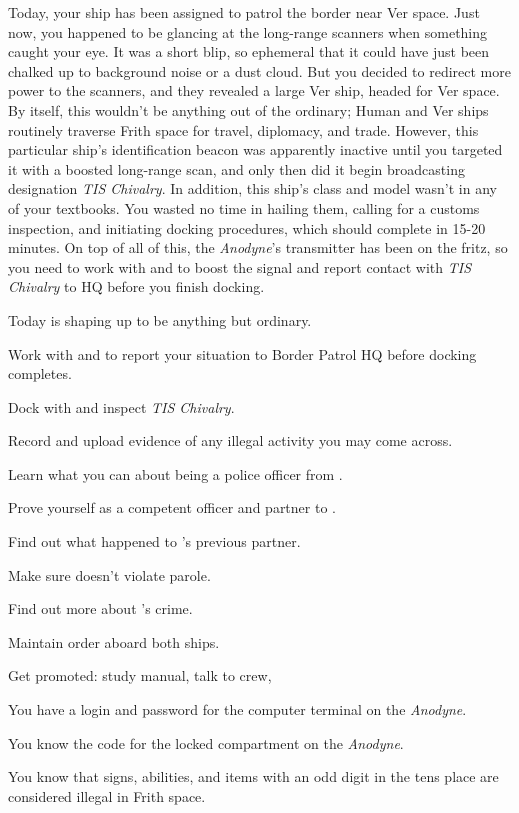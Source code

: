 \documentclass[char]{guildcamp4}
\begin{document}
Today, your ship has been assigned to patrol the border near Ver space. Just now, you happened to be glancing at the long-range scanners when something caught your eye. It was a short blip, so ephemeral that it could have just been chalked up to background noise or a dust cloud. But you decided to redirect more power to the scanners, and they revealed a large Ver ship, headed for Ver space. By itself, this wouldn't be anything out of the ordinary; Human and Ver ships routinely traverse Frith space for travel, diplomacy, and trade. However, this particular ship's identification beacon was apparently inactive until you targeted it with a boosted long-range scan, and only then did it begin broadcasting designation \emph{TIS Chivalry}. In addition, this ship's class and model wasn't in any of your textbooks. You wasted no time in hailing them, calling for a customs inspection, and initiating docking procedures, which should complete in 15-20 minutes. On top of all of this, the \emph{Anodyne}'s transmitter has been on the fritz, so you need to work with \cCbad{} and \cPilot{} to boost the signal and report contact with \emph{TIS Chivalry} to HQ before you finish docking.

Today is shaping up to be anything but ordinary.

\begin{itemz}[Goals]
	\item Work with \cCbad{} and \cPilot{} to report your situation to Border Patrol HQ before docking completes.
	\item Dock with and inspect \emph{TIS Chivalry}.
	\item Record and upload evidence of any illegal activity you may come across.
	\item Learn what you can about being a police officer from \cCbad{}.
	\item Prove yourself as a competent officer and partner to \cCbad{}.
	\item Find out what happened to \cCbad{}'s previous partner.
	\item Make sure \cPilot{} doesn't violate \cPilot{\their} parole. 
	\item Find out more about \cPilot{}'s crime.
	\item Maintain order aboard both ships.
	\item Get promoted: study manual, talk to crew, 
\end{itemz}

\begin{itemz}[Notes]
	\item You have a login and password for the computer terminal on the \emph{Anodyne}.
	\item You know the code for the locked compartment on the \emph{Anodyne}.
	\item You know that signs, abilities, and items with an odd digit in the tens place are considered illegal in Frith space.
\end{itemz}

\begin{contacts}
	\contact{\cTest{}}
\end{contacts}
\end{document}
